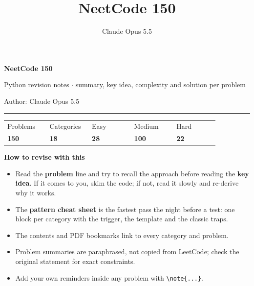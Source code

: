 \documentclass[10pt,a4paper]{article}
\title{NeetCode 150}
\author{Claude Opus 5.5}
\date{}
\newcommand{\note}[1]{\noindent{\color{accent}\textbf{My note:} #1}\par}
\begin{document}
\thispagestyle{empty}
\vspace*{25mm}
{\fontsize{30}{36}\selectfont\bfseries NeetCode 150\par}
\vspace{4pt}
{\large\color{muted} Python revision notes $\cdot$ summary, key idea, complexity and solution per problem\par}
\vspace{6pt}
{\color{muted} Author: Claude Opus 5.5\par}
\vspace{10mm}
{\color{rule}\hrule}
\vspace{4pt}
\noindent
\begin{tabular}{@{}p{0.18\linewidth}p{0.18\linewidth}p{0.18\linewidth}p{0.18\linewidth}p{0.18\linewidth}@{}}
{\scriptsize\color{muted}Problems} & {\scriptsize\color{muted}Categories} & {\scriptsize\color{muted}Easy} & {\scriptsize\color{muted}Medium} & {\scriptsize\color{muted}Hard}\\
{\LARGE\bfseries 150} & {\LARGE\bfseries 18} & \textcolor{easy}{\LARGE\bfseries 28} & \textcolor{medium}{\LARGE\bfseries 100} & \textcolor{hard}{\LARGE\bfseries 22}
\end{tabular}

\vspace{10mm}
{\large\bfseries How to revise with this\par}
\begin{itemize}[leftmargin=12pt,itemsep=2pt]\small
  \item Read the \textbf{problem} line and try to recall the approach before reading the \textbf{key idea}. If it comes to you, skim the code; if not, read it slowly and re-derive why it works.
  \item The \textbf{pattern cheat sheet} is the fastest pass the night before a test: one block per category with the trigger, the template and the classic traps.
  \item The contents and PDF bookmarks link to every category and problem.
  \item Problem summaries are paraphrased, not copied from LeetCode; check the original statement for exact constraints.
  \item Add your own reminders inside any problem with \verb|\note{...}|.
\end{itemize}
\end{document}

